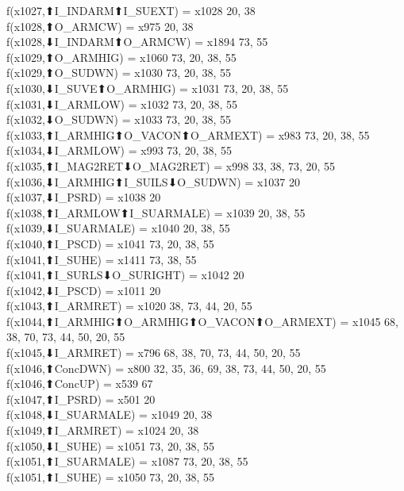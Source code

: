 f(x1027,⬆I_INDARM⬆I_SUEXT) = x1028 {20, 38} \\
f(x1028,⬆O_ARMCW) = x975 {20, 38} \\
f(x1028,⬇I_INDARM⬆O_ARMCW) = x1894 {73, 55} \\
f(x1029,⬆O_ARMHIG) = x1060 {73, 20, 38, 55} \\
f(x1029,⬆O_SUDWN) = x1030 {73, 20, 38, 55} \\
f(x1030,⬇I_SUVE⬆O_ARMHIG) = x1031 {73, 20, 38, 55} \\
f(x1031,⬇I_ARMLOW) = x1032 {73, 20, 38, 55} \\
f(x1032,⬇O_SUDWN) = x1033 {73, 20, 38, 55} \\
f(x1033,⬆I_ARMHIG⬆O_VACON⬆O_ARMEXT) = x983 {73, 20, 38, 55} \\
f(x1034,⬇I_ARMLOW) = x993 {73, 20, 38, 55} \\
f(x1035,⬆I_MAG2RET⬇O_MAG2RET) = x998 {33, 38, 73, 20, 55} \\
f(x1036,⬇I_ARMHIG⬆I_SUILS⬇O_SUDWN) = x1037 {20} \\
f(x1037,⬇I_PSRD) = x1038 {20} \\
f(x1038,⬆I_ARMLOW⬆I_SUARMALE) = x1039 {20, 38, 55} \\
f(x1039,⬇I_SUARMALE) = x1040 {20, 38, 55} \\
f(x1040,⬆I_PSCD) = x1041 {73, 20, 38, 55} \\
f(x1041,⬆I_SUHE) = x1411 {73, 38, 55} \\
f(x1041,⬆I_SURLS⬇O_SURIGHT) = x1042 {20} \\
f(x1042,⬇I_PSCD) = x1011 {20} \\
f(x1043,⬆I_ARMRET) = x1020 {38, 73, 44, 20, 55} \\
f(x1044,⬆I_ARMHIG⬆O_ARMHIG⬆O_VACON⬆O_ARMEXT) = x1045 {68, 38, 70, 73, 44, 50, 20, 55} \\
f(x1045,⬇I_ARMRET) = x796 {68, 38, 70, 73, 44, 50, 20, 55} \\
f(x1046,⬆ConcDWN) = x800 {32, 35, 36, 69, 38, 73, 44, 50, 20, 55} \\
f(x1046,⬆ConcUP) = x539 {67} \\
f(x1047,⬆I_PSRD) = x501 {20} \\
f(x1048,⬇I_SUARMALE) = x1049 {20, 38} \\
f(x1049,⬆I_ARMRET) = x1024 {20, 38} \\
f(x1050,⬇I_SUHE) = x1051 {73, 20, 38, 55} \\
f(x1051,⬆I_SUARMALE) = x1087 {73, 20, 38, 55} \\
f(x1051,⬆I_SUHE) = x1050 {73, 20, 38, 55} \\
